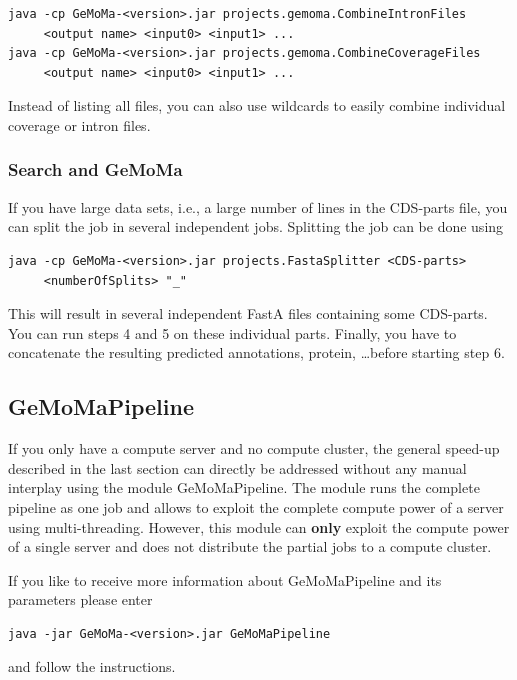 \documentclass{article}
\begin{document}
\begin{verbatim}
java -cp GeMoMa-<version>.jar projects.gemoma.CombineIntronFiles
     <output name> <input0> <input1> ...
java -cp GeMoMa-<version>.jar projects.gemoma.CombineCoverageFiles
     <output name> <input0> <input1> ...
\end{verbatim}

Instead of listing all files, you can also use wildcards to easily combine individual coverage or intron files.

\subsubsection{Search and GeMoMa}
If you have large data sets, i.e., a large number of lines in the CDS-parts file, you can split the job in several independent jobs. Splitting the job can be done using
\begin{verbatim}
java -cp GeMoMa-<version>.jar projects.FastaSplitter <CDS-parts> 
     <numberOfSplits> "_"
\end{verbatim}

This will result in several independent FastA files containing some CDS-parts. You can run steps 4 and 5 on these individual parts.
Finally, you have to concatenate the resulting predicted annotations, protein, \ldots before starting step 6.

\subsection{GeMoMaPipeline}
If you only have a compute server and no compute cluster, the general speed-up described in the last section can directly be addressed without any manual interplay using the module GeMoMaPipeline. The module runs the complete pipeline as one job and allows to exploit the complete compute power of a server using multi-threading. 
However, this module can \textbf{only} exploit the compute power of a single server and does not distribute the partial jobs to a compute cluster.

If you like to receive more information about GeMoMaPipeline and its parameters please enter
\begin{verbatim}
java -jar GeMoMa-<version>.jar GeMoMaPipeline
\end{verbatim}
and follow the instructions.
\end{document}
